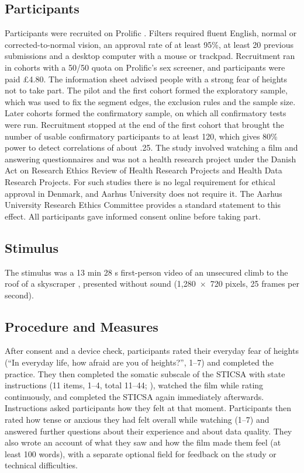 \documentclass[man,12pt,british]{apa7}
\begin{document}
\subsection{Participants}

Participants were recruited on Prolific \parencite{palan2018prolific}. Filters required fluent English, normal or
corrected-to-normal vision, an approval rate of at least 95\%, at least 20 previous submissions and a desktop
computer with a mouse or trackpad. Recruitment ran in cohorts with a 50/50 quota on Prolific's sex screener, and
participants were paid \pounds 4.80. The information sheet advised people with a strong fear of heights not to take
part. The pilot and the first cohort formed the exploratory sample, which was used to fix the segment edges, the
exclusion rules and the sample size. Later cohorts formed the confirmatory sample, on which all confirmatory tests
were run. Recruitment stopped at the end of the first cohort that brought the number of usable confirmatory
participants to at least 120, which gives 80\% power to detect correlations of about .25. The study involved watching
a film and answering questionnaires and was not a health research project under the Danish Act on Research Ethics
Review of Health Research Projects and Health Data Research Projects. For such studies there is no legal requirement
for ethical approval in Denmark, and Aarhus University does not require it. The Aarhus University Research Ethics
Committee provides a standard statement to this effect. All participants gave informed consent online before taking
part.

\subsection{Stimulus}

The stimulus was a 13 min 28 s first-person video of an unsecured climb to the roof of a skyscraper
\parencite{tikhomirov2017dubai}, presented without sound (1,280~$\times$~720 pixels, 25 frames per second).

\subsection{Procedure and Measures}

After consent and a device check, participants rated their everyday fear of heights (\enquote{In everyday life, how
afraid are you of heights?}, 1--7) and completed the practice. They then completed the somatic subscale of the STICSA
with state instructions (11 items, 1--4, total 11--44; \cite{ree2008distinguishing}), watched the film while rating
continuously, and completed the STICSA again immediately afterwards. Instructions asked participants how they felt at
that moment. Participants then rated how tense or anxious they had felt overall while watching (1--7) and answered
further questions about their experience and about data quality. They also wrote an account of what they saw and how
the film made them feel (at least 100 words), with a separate optional field for feedback on the study or technical
difficulties.
\end{document}
